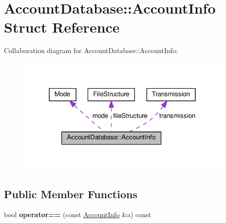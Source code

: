 \hypertarget{structAccountDatabase_1_1AccountInfo}{}\section{Account\+Database\+:\+:Account\+Info Struct Reference}
\label{structAccountDatabase_1_1AccountInfo}


Collaboration diagram for Account\+Database\+:\+:Account\+Info\+:
\nopagebreak
\begin{figure}[H]
\begin{center}
\leavevmode
\includegraphics[width=306pt]{structAccountDatabase_1_1AccountInfo__coll__graph}
\end{center}
\end{figure}
\subsection*{Public Member Functions}
\begin{DoxyCompactItemize}
\item 
\mbox{\label{structAccountDatabase_1_1AccountInfo_a50837455c9c85dfcd6809f7e0939f276}} 
bool {\bfseries operator==} (const \hyperlink{structAccountDatabase_1_1AccountInfo}{Account\+Info} \&a) const
\end{DoxyCompactItemize}
